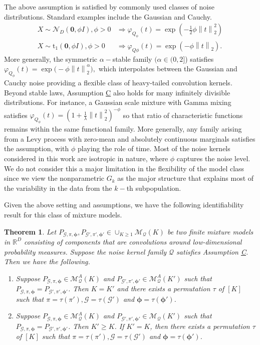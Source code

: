 \documentclass[bj,authoryear]{imsart}
\theoremstyle{plain}
\newtheorem{theorem}{Theorem}
\theoremstyle{remark}
\def\bphi{{\boldsymbol\phi}}
\def\bbR{\mathbb{R}}
\def\cG{\mathcal{G}}
\def\cM{\mathcal{M}}
\def\cN{\mathcal{N}}
\def\cQ{\mathcal{Q}}
\def\norm#1{\left\|#1\right\|}
\begin{document}
The above assumption is satisfied by commonly used classes of noise distributions. Standard examples include the Gaussian and Cauchy.
\begin{align*}
    X\sim \cN_D(\boldsymbol{0}, \phi I), \phi>0&\Rightarrow \varphi_{Q_\phi}(t) = \exp\left(-\frac{1}{2}\phi \norm{t}_2^2\right) \\
    X \sim \text{t}_1(\boldsymbol{0}, \phi I), \phi>0 
&\Rightarrow \varphi_{Q\phi}(t) = \exp\left(-\phi \norm{t}_2\right).
\end{align*}
More generally, the symmetric $\alpha-$stable family $(\alpha\in (0,2]$) satisfies $\varphi_{Q_\phi}(t) = \exp\big(-\phi \norm{t}_2^\alpha\big),$
which interpolates between the Gaussian and Cauchy noise providing a flexible class of heavy-tailed convolution kernels. Beyond stable laws, Assumption \hyperref[assume:C]{C} also holds for many infinitely divisible distributions. For instance, a Gaussian scale mixture with Gamma mixing satisfies $\varphi_{Q_\phi}(t) = (1 + \tfrac{1}{\lambda}\norm{t}_2^2)^{-\phi}$
so that ratio of characteristic functions remains within the same functional family. More generally, any family arising from a Levy process with zero-mean and absolutely continuous marginals satisfies the assumption, with $\phi$ playing the role of time. Most of the noise kernels considered in this work are isotropic in nature, where $\phi$ captures the noise level. We do not consider this a major limitation in the flexibility of the model class since we view the nonparametric $G_k$ as the major structure that explains most of the variability in the data from the $k-$th subpopulation.

Given the above setting and assumptions, we have the following identifiability result for this class of mixture models. 

\begin{theorem}\label{thm:isotropic_identifiability}
Let $P_{\cG,\pi,\bphi}, P_{\cG',\pi',\bphi'}\in \cup_{K\geq 1} \cM_\cQ(K)$ be two finite mixture models in $\bbR^D$ consisting of components that are convolutions around low-dimensional probability measures. Suppose the noise kernel family $\cQ$ satisfies Assumption \hyperref[assume:C]{C}. Then we have the following.
\begin{enumerate}
    \item Suppose $P_{\cG,\pi,\bphi}\in \cM_{\cQ}^A(K)$ and $P_{\cG',\pi',\bphi'}\in \cM_{\cQ}^A(K')$ such that $P_{\cG,\pi,\bphi}=P_{\cG',\pi',\bphi'}$. Then $K=K'$ and there exists a permutation $\tau$ of $[K]$ such that $\pi=\tau(\pi'), \cG=\tau(\cG')$ and $\bphi=\tau(\bphi')$.
    \item Suppose $P_{\cG,\pi,\bphi}\in \cM_{\cQ}^A(K)$ and $P_{\cG',\pi',\bphi'}\in \cM_{\cQ}(K')$ such that $P_{\cG,\pi,\bphi}=P_{\cG',\pi',\bphi'}$. Then $K'\geq K$. If $K'=K$, then there exists a permutation $\tau$ of $[K]$ such that $\pi=\tau(\pi'), \cG=\tau(\cG')$ and $\bphi=\tau(\bphi')$.
\end{enumerate}
\end{theorem}
\end{document}
